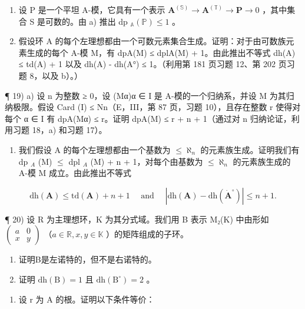 \begin{enumerate}
\def\labelenumi{\alph{enumi})}
\setcounter{enumi}{1}
\item
  设 P 是一个平坦 A-模，它具有一个表示 \(\mathbf{A}^{(\mathbb{S})}\to\mathbf{A}^{(\mathbb{T})}\to\mathbf{P}\to0\) ，其中集合 S 是可数的。由 a) 推出 dp \(_{\mathbb{A}}(\mathbb{P})\leqslant1\) 。
\item
  假设环 A 的每个左理想都由一个可数元素集合生成。证明：对于由可数族元素生成的每个 A-模 M，有 dpA(M) ≤ dplA(M) + 1。由此推出不等式 dh(A) ≤ td(A) + 1 以及 \textbar dh(A) - dh(A°)\textbar{} ≤ 1。（利用第 181 页习题 12、第 202 页习题 8，以及 b）。）
\end{enumerate}

¶ 19) a) 设 n 为整数 ≥ 0，设 (Mα)α ∈ I 是 A-模的一个归纳系，并设 M 为其归纳极限。假设 Card (I) ≤ Nn（E，III，第 87 页，习题 10），且存在整数 r 使得对每个 α ∈ I 有 dpA(Mα) ≤ r。证明 dpA(M) ≤ r + n + 1（通过对 n 归纳论证，利用习题 18，a) 和习题 17）。

\begin{enumerate}
\def\labelenumi{\alph{enumi})}
\setcounter{enumi}{1}
\tightlist
\item
  我们假设 A 的每个左理想都由一个基数为 \(\leqslant \aleph_{n}\) 的元素族生成。证明我们有 dp \(_{A}\) (M) \(\leqslant\) dpl \(_{A}\) (M) + n + 1，对每个由基数为 \(\leqslant \aleph_{n}\) 的元素族生成的 A-模 M 成立。由此推出不等式
\end{enumerate}

\[
\mathrm{dh} (\mathbf {A}) \leqslant \mathrm{td} (\mathbf {A}) + n + 1 \quad \text { and } \quad | \mathrm{dh} (\mathbf {A}) - \mathrm{dh} (\dot {\mathbf {A}} ^ {\circ}) | \leqslant n + 1.
\]

¶ 20) 设 R 为主理想环，K 为其分式域。我们用 B 表示 M₂(K) 中由形如 \(\begin{pmatrix} a & 0 \\ x & y \end{pmatrix}\) （\(a \in \mathbb{R}, x, y \in \mathbb{K}\) ）的矩阵组成的子环。

\begin{enumerate}
\def\labelenumi{\alph{enumi})}
\item
  证明B是左诺特的，但不是右诺特的。
\item
  证明 \(\mathrm{dh(B)} = 1\) 且 \(\mathrm{dh(B^{\circ})} = 2\) 。
\end{enumerate}

\begin{enumerate}
\def\labelenumi{\arabic{enumi})}
\setcounter{enumi}{20}
\tightlist
\item
  设 r 为 A 的根。证明以下条件等价：
\end{enumerate}

